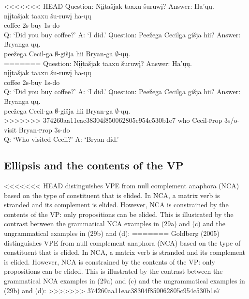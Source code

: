 \documentclass[output=paper]{LSP/langsci}
\begin{document}
\begin{exe}
\ex
\begin{xlist}
\ex
<<<<<<< HEAD
\glll Question: {Nįįtašjak taaxu} šuruwį? Answer: Ha'ųų.\\
{} {nįįtašjak taaxu} šu-ruwį {} ha-ųų\\
{} coffee {\textsc 2s}-buy {} {\textsc 1s}-do\\
 \trans Q: `Did you buy coffee?' A: `I did.'
\ex
\glll Question: Peežega Cecilga {gišja hii}? Answer: Bryanga ųų.\\
{} peežega Cecil-ga $\emptyset$-{gišja hii} {} Bryan-ga $\emptyset$-ųų.\\
=======
\glll Question: {N\k{i}\k{i}ta\v{s}jak taaxu} \v{s}uruw\k{i}? Answer: Ha'\k{u}\k{u}.\\
{} {n\k{i}\k{i}ta\v{s}jak taaxu} \v{s}u-ruw\k{i} {} ha-\k{u}\k{u}\\
{} coffee {\textsc 2s}-buy {} {\textsc 1s}-do\\
 \trans Q: `Did you buy coffee?' A: `I did.'
\ex
\glll Question: Pee\v{z}ega Cecilga {gi\v{s}ja hii}? Answer: Bryanga \k{u}\k{u}.\\
{} pee\v{z}ega Cecil-ga $\emptyset$-{gi\v{s}ja hii} {} Bryan-ga $\emptyset$-\k{u}\k{u}.\\
>>>>>>> 374260aa11eac38304f850062805c954c530b1e7
{} who Cecil-{\textsc prop} {\textsc 3s/o}-visit {} Bryan-{\textsc prop} {\textsc 3s}-do\\
\trans Q: `Who visited Cecil?' A: `Bryan did.'
\end{xlist}
\end{exe}


\subsection{Ellipsis and the contents of the VP}

<<<<<<< HEAD
\citet{Goldberg2005} distinguishes VPE from null complement anaphora (NCA) based on the type of constituent that is elided. In NCA, a matrix verb is stranded and its complement is elided. However, NCA is constrained by the contents of the VP: only propositions can be elided. This is illustrated by the contrast between the grammatical NCA examples in (29a) and (c) and the ungrammatical examples in (29b) and (d):
=======
Goldberg (2005) distinguishes VPE from null complement anaphora (NCA) based on the type of constituent that is elided. In NCA, a matrix verb is stranded and its complement is elided. However, NCA is constrained by the contents of the VP: only propositions can be elided. This is illustrated by the contrast between the grammatical NCA examples in (29a) and (c) and the ungrammatical examples in (29b) and (d):
>>>>>>> 374260aa11eac38304f850062805c954c530b1e7
\end{document}
